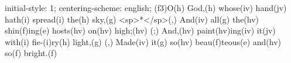 initial-style: 1;
centering-scheme: english;
(f3)O(h) God,(h) whose(iv) hand(jv) hath(i) spread(i) the(h) sky,(g) <sp>*</sp>(,)
And(iv) all(g) the(hv) shin(f)ing(e) hosts(hv) on(hv) high;(hv) (;)
And,(hv) paint(hv)ing(iv) it(jv) with(i) fie-(i)ry(h) light,(g) (,)
Made(iv) it(g) so(hv) beau(f)teous(e) and(hv) so(f) bright.(f)
